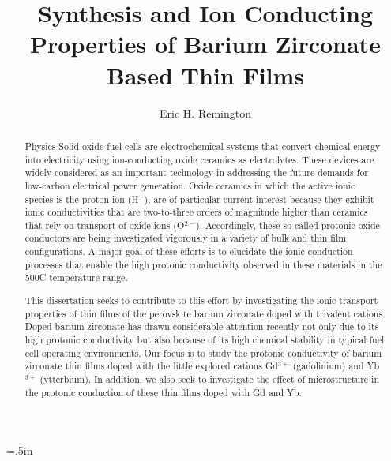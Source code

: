 \documentclass[phd, reqno]{uab-thesis}   %
\begin{document}
\title{Synthesis and Ion Conducting Properties of Barium Zirconate Based Thin Films}
\author{Eric H. Remington}

\maketitlepage
\copyrightpage

\raggedright\parindent=.5in

\begin{abstract}{Physics}
Solid oxide fuel cells are electrochemical systems that convert chemical energy into electricity using ion-conducting oxide ceramics as electrolytes. These devices are widely considered as an important technology in addressing the future demands for low-carbon electrical power generation. Oxide ceramics in which the active ionic species is the proton ion (H$^{+}$), are of particular current interest because they exhibit ionic conductivities that are two-to-three orders of magnitude higher than ceramics that rely on transport of oxide ions (O$^{2-}$). Accordingly, these so-called protonic oxide conductors are being investigated vigorously in a variety of bulk and thin film configurations. A major goal of these efforts is to elucidate the ionic conduction processes that enable the high protonic conductivity observed in these materials in the 500\textdegree C temperature range.

This dissertation seeks to contribute to this effort by investigating the ionic transport properties of thin films of the perovskite barium zirconate doped with trivalent cations. Doped barium zirconate has drawn considerable attention recently not only due to its high protonic conductivity but also because of its high chemical stability in typical fuel cell operating environments. Our focus is to study the protonic conductivity of barium zirconate thin films doped with the little explored cations Gd$^{3+}$ (gadolinium) and Yb$^{3+}$ (ytterbium). In addition, we also seek to investigate the effect of microstructure in the protonic conduction of these thin films doped with Gd and Yb.
\end{abstract}
\end{document}
